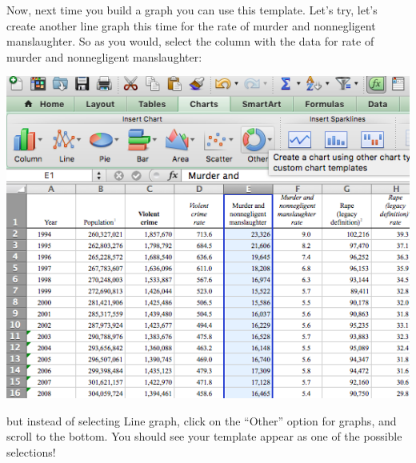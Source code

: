 \documentclass[]{book}
\theoremstyle{definition}
\theoremstyle{definition}
\theoremstyle{definition}
\theoremstyle{remark}
\begin{document}
Now, next time you build a graph you can use this template. Let's try,
let's create another line graph this time for the rate of murder and
nonnegligent manslaughter. So as you would, select the column with the
data for rate of murder and nonnegligent manslaughter:

\includegraphics{imgs/select_mm_col.png}

but instead of selecting Line graph, click on the ``Other'' option for
graphs, and scroll to the bottom. You should see your template appear as
one of the possible selections!
\end{document}
